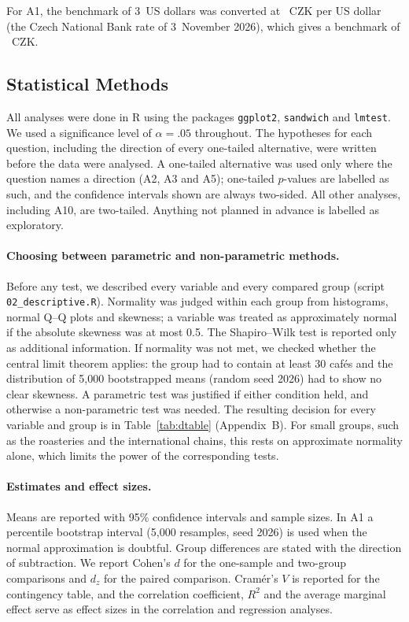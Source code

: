 \documentclass[11pt,a4paper]{article}
\begin{document}
For A1, the benchmark of 3~US dollars was converted at \AOneRate{}~CZK per US dollar (the Czech National Bank rate of 3~November 2026), which gives a benchmark of \AOneBench{}~CZK.

\FloatBarrier
\subsection{Statistical Methods}

All analyses were done in R using the packages \texttt{ggplot2}, \texttt{sandwich} and \texttt{lmtest}. We used a significance level of $\alpha = .05$ throughout. The hypotheses for each question, including the direction of every one-tailed alternative, were written before the data were analysed. A one-tailed alternative was used only where the question names a direction (A2, A3 and A5); one-tailed $p$-values are labelled as such, and the confidence intervals shown are always two-sided. All other analyses, including A10, are two-tailed. Anything not planned in advance is labelled as exploratory.

\paragraph{Choosing between parametric and non-parametric methods.} Before any test, we described every variable and every compared group (script \texttt{02\_descriptive.R}). Normality was judged within each group from histograms, normal Q--Q plots and skewness; a variable was treated as approximately normal if the absolute skewness was at most 0.5. The Shapiro--Wilk test is reported only as additional information. If normality was not met, we checked whether the central limit theorem applies: the group had to contain at least 30 caf\'es and the distribution of 5{,}000 bootstrapped means (random seed 2026) had to show no clear skewness. A parametric test was justified if either condition held, and otherwise a non-parametric test was needed. The resulting decision for every variable and group is in Table~\ref{tab:dtable} (Appendix~B). For small groups, such as the roasteries and the international chains, this rests on approximate normality alone, which limits the power of the corresponding tests.

\paragraph{Estimates and effect sizes.} Means are reported with 95\% confidence intervals and sample sizes. In A1 a percentile bootstrap interval (5{,}000 resamples, seed 2026) is used when the normal approximation is doubtful. Group differences are stated with the direction of subtraction. We report Cohen's $d$ for the one-sample and two-group comparisons and $d_z$ for the paired comparison. Cram\'er's $V$ is reported for the contingency table, and the correlation coefficient, $R^2$ and the average marginal effect serve as effect sizes in the correlation and regression analyses.
\end{document}
